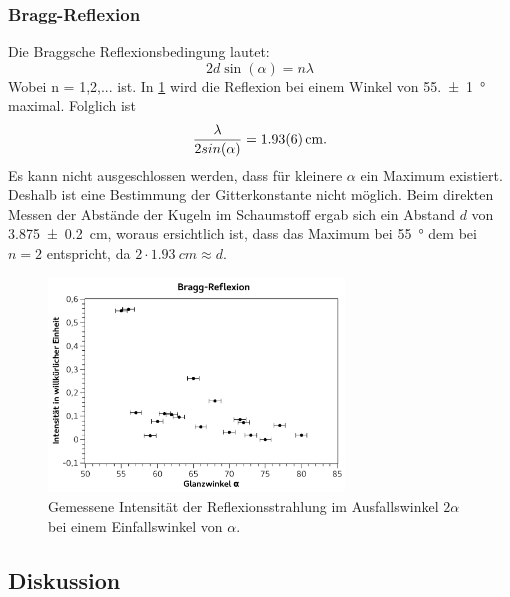 \documentclass[
	a4paper,
	12pt,
	pagesize,
	ngerman
]{scrartcl}
\begin{document}
	\subsubsection{Bragg-Reflexion}
	Die Braggsche Reflexionsbedingung lautet:
	\begin{equation}
		2d \sin(\alpha) = n \lambda
	\end{equation}
	Wobei n = 1,2,... ist. %
	In \cref{fig_bragg} wird die Reflexion bei einem Winkel von \SI{55,+-1}{\degree} maximal.
	Folglich ist 
	\begin{equation*}
		\frac{\lambda}{2sin(\alpha)} = \SI{1,93+-0,06}{cm}. %
	\end{equation*}
	Es kann nicht ausgeschlossen werden, dass für kleinere $\alpha$ ein Maximum existiert.
	Deshalb ist eine Bestimmung der Gitterkonstante nicht möglich.
	Beim direkten Messen der Abstände der Kugeln im Schaumstoff ergab sich ein Abstand $d$ von \SI{3,875+-0,2}{cm}, woraus ersichtlich ist, dass das Maximum bei \SI{55}{\degree} dem bei $n=2$ entspricht, da $2\cdot\SI{1,93}{cm} \approx d$. %
	\begin{figure}[H]
		\includegraphics[width=0.7\textwidth]{fig_bragg}
		\centering
		\caption{Gemessene Intensität der Reflexionsstrahlung im Ausfallswinkel $2\alpha$ bei einem Einfallswinkel von $\alpha$.}
		\label{fig_bragg}
		\centering
	\end{figure}
	\subsection{Diskussion}
	
\end{document}
